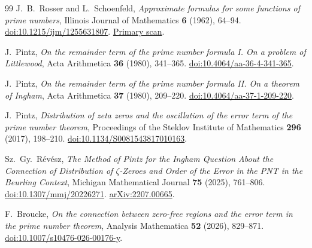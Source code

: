 \documentclass[11pt,a4paper]{article}
\numberwithin{equation}{section}
\theoremstyle{definition}\newtheorem{definition}[theorem]{Definition}
\theoremstyle{remark}\newtheorem{remark}[theorem]{Remark}
\begin{document}
\begin{thebibliography}{99}
J.~B.~Rosser and L.~Schoenfeld,
\emph{Approximate formulas for some functions of prime numbers},
Illinois Journal of Mathematics \textbf{6} (1962), 64--94.
\href{https://doi.org/10.1215/ijm/1255631807}{doi:10.1215/ijm/1255631807}.
\href{https://denisevellachemla.eu/Rosser-Schoenfeld-1962.pdf}{Primary scan}.

J.~Pintz,
\emph{On the remainder term of the prime number formula I.
On a problem of Littlewood},
Acta Arithmetica \textbf{36} (1980), 341--365.
\href{https://doi.org/10.4064/aa-36-4-341-365}{doi:10.4064/aa-36-4-341-365}.

J.~Pintz,
\emph{On the remainder term of the prime number formula II.
On a theorem of Ingham},
Acta Arithmetica \textbf{37} (1980), 209--220.
\href{https://doi.org/10.4064/aa-37-1-209-220}{doi:10.4064/aa-37-1-209-220}.

J.~Pintz,
\emph{Distribution of zeta zeros and the oscillation of the error
term of the prime number theorem},
Proceedings of the Steklov Institute of Mathematics
\textbf{296} (2017), 198--210.
\href{https://doi.org/10.1134/S0081543817010163}{doi:10.1134/S0081543817010163}.

Sz.~Gy.~R\'ev\'esz,
\emph{The Method of Pintz for the Ingham Question About the
Connection of Distribution of $\zeta$-Zeroes and Order of the Error
in the PNT in the Beurling Context},
Michigan Mathematical Journal \textbf{75} (2025), 761--806.
\href{https://doi.org/10.1307/mmj/20226271}{doi:10.1307/mmj/20226271}.
\href{https://arxiv.org/abs/2207.00665}{arXiv:2207.00665}.

F.~Broucke,
\emph{On the connection between zero-free regions and the
error term in the prime number theorem},
Analysis Mathematica \textbf{52} (2026), 829--871.
\href{https://doi.org/10.1007/s10476-026-00176-y}{doi:10.1007/s10476-026-00176-y}.
\end{thebibliography}
\end{document}
